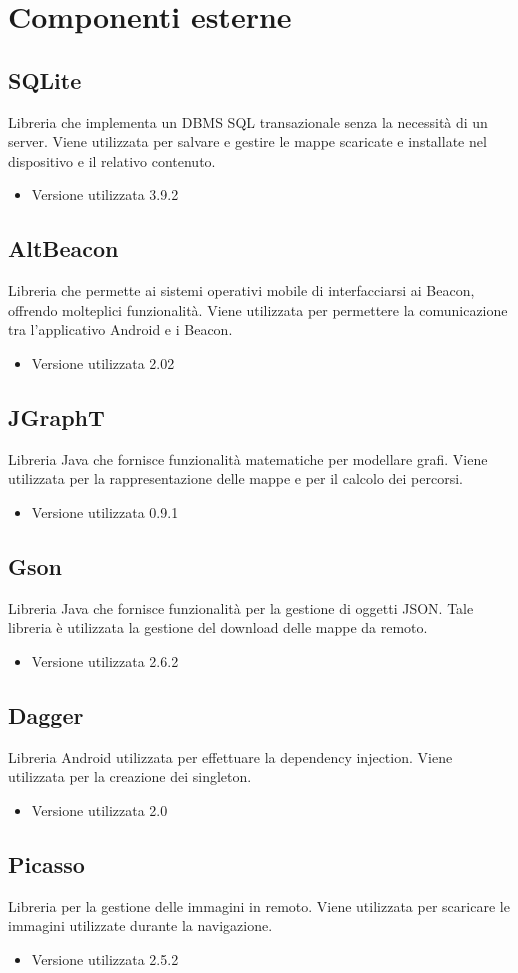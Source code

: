 \documentclass[../ManualeSviluppatore.tex]{subfiles}
\begin{document}
\section{Componenti esterne}
	
	\subsection{SQLite}
		Libreria che implementa un DBMS SQL transazionale senza la necessità di un server. Viene utilizzata per salvare e gestire le mappe scaricate e installate nel dispositivo e il relativo contenuto.
		\begin{itemize} \item Versione utilizzata 3.9.2\end{itemize}

	\subsection{AltBeacon}
		Libreria che permette ai sistemi operativi mobile di interfacciarsi ai Beacon, offrendo molteplici funzionalità. Viene utilizzata per permettere la comunicazione tra l'applicativo Android e i Beacon.
		\begin{itemize} \item Versione utilizzata 2.02\end{itemize}
		
	\subsection{JGraphT}
		Libreria Java che fornisce funzionalità matematiche per modellare grafi. Viene utilizzata per la rappresentazione delle mappe e per il calcolo dei percorsi. 
		\begin{itemize} \item Versione utilizzata 0.9.1\end{itemize}

	\subsection{Gson}
		Libreria Java che fornisce funzionalità per la gestione di oggetti JSON. Tale libreria è utilizzata la gestione del download delle mappe da remoto. 
		\begin{itemize} \item Versione utilizzata 2.6.2\end{itemize}

	\subsection{Dagger}
		Libreria Android utilizzata per effettuare la dependency injection. Viene utilizzata per la creazione dei singleton.
		\begin{itemize} \item Versione utilizzata 2.0\end{itemize}

	\subsection{Picasso}
		Libreria per la gestione delle immagini in remoto. Viene utilizzata per scaricare le immagini utilizzate durante la navigazione.
		\begin{itemize} \item Versione utilizzata 2.5.2\end{itemize}
\end{document}
